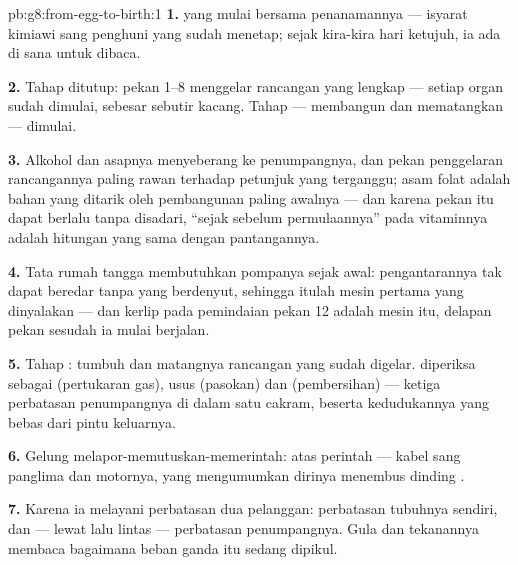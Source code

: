 \begin{solution}{pb:g8:from-egg-to-birth:1}
\textbf{1.}   yang mulai bersama penanamannya
--- isyarat kimiawi sang penghuni yang sudah menetap; sejak
kira-kira hari ketujuh, ia ada di sana untuk dibaca.

\textbf{2.} Tahap  ditutup: pekan 1--8 menggelar
rancangan yang lengkap --- setiap organ sudah dimulai,
sebesar sebutir kacang. Tahap  --- membangun dan
mematangkan --- dimulai.

\textbf{3.} Alkohol dan asapnya menyeberang ke penumpangnya,
dan pekan penggelaran rancangannya paling rawan terhadap
petunjuk yang terganggu; asam folat adalah bahan yang
ditarik oleh pembangunan paling awalnya --- dan karena pekan
itu dapat berlalu tanpa disadari, ``sejak sebelum
permulaannya'' pada vitaminnya adalah hitungan yang sama
dengan pantangannya.

\textbf{4.} Tata rumah tangga  membutuhkan
pompanya sejak awal: pengantarannya tak dapat beredar tanpa
 yang berdenyut, sehingga itulah mesin pertama yang
dinyalakan --- dan kerlip pada pemindaian pekan 12 adalah
mesin itu, delapan pekan sesudah ia mulai berjalan.

\textbf{5.} Tahap : tumbuh dan matangnya rancangan
yang sudah digelar.  diperiksa sebagai 
(pertukaran gas), usus (pasokan) dan  (pembersihan) ---
ketiga perbatasan penumpangnya di dalam satu cakram, beserta
kedudukannya yang bebas dari pintu keluarnya.

\textbf{6.} Gelung melapor-memutuskan-memerintah: 
 atas perintah  --- kabel sang panglima
dan motornya, yang mengumumkan dirinya menembus dinding
.

\textbf{7.} Karena ia melayani perbatasan dua pelanggan:
perbatasan tubuhnya sendiri, dan --- lewat lalu lintas
 --- perbatasan penumpangnya. Gula dan tekanannya
membaca bagaimana beban ganda itu sedang dipikul.


\end{solution}
